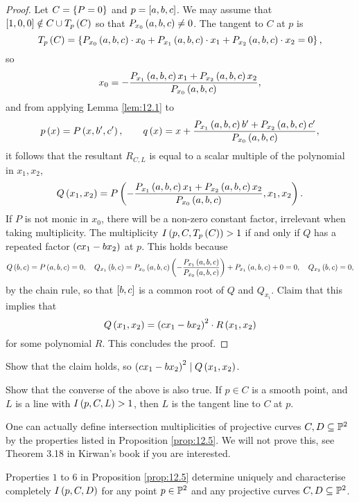\begin{proof}
Let $ C = \cb{P = 0} $ and $ p = \sb{a, b, c} $. We may assume that $ \sb{1, 0, 0} \notin C \cup T_p\rb{C} $ so that $ P_{x_0}\rb{a, b, c} \ne 0 $. The tangent to $ C $ at $ p $ is
$$ T_p\rb{C} = \cb{P_{x_0}\rb{a, b, c} \cdot x_0 + P_{x_1}\rb{a, b, c} \cdot x_1 + P_{x_2}\rb{a, b, c} \cdot x_2 = 0}, $$
so
$$ x_0 = -\dfrac{P_{x_1}\rb{a, b, c}x_1 + P_{x_2}\rb{a, b, c}x_2}{P_{x_0}\rb{a, b, c}}, $$
and from applying Lemma \ref{lem:12.1} to
$$ p\rb{x} = P\rb{x, b', c'}, \qquad q\rb{x} = x + \dfrac{P_{x_1}\rb{a, b, c}b' + P_{x_2}\rb{a, b, c}c'}{P_{x_0}\rb{a, b, c}}, $$
it follows that the resultant $ R_{C, L} $ is equal to a scalar multiple of the polynomial in $ x_1, x_2 $,
$$ Q\rb{x_1, x_2} = P\rb{-\dfrac{P_{x_1}\rb{a, b, c}x_1 + P_{x_2}\rb{a, b, c}x_2}{P_{x_0}\rb{a, b, c}}, x_1, x_2}. $$
If $ P $ is not monic in $ x_0 $, there will be a non-zero constant factor, irrelevant when taking multiplicity. The multiplicity $ I\rb{p, C, T_p\rb{C}} > 1 $ if and only if $ Q $ has a repeated factor $ \rb{cx_1 - bx_2} $ at $ p $. This holds because
$$ Q\rb{b, c} = P\rb{a, b, c} = 0, \quad Q_{x_1}\rb{b, c} = P_{x_0}\rb{a, b, c}\rb{-\dfrac{P_{x_1}\rb{a, b, c}}{P_{x_0}\rb{a, b, c}}} + P_{x_1}\rb{a, b, c} + 0 = 0, \quad Q_{x_2}\rb{b, c} = 0, $$
by the chain rule, so that $ \sb{b, c} $ is a common root of $ Q $ and $ Q_{x_i} $. Claim that this implies that
$$ Q\rb{x_1, x_2} = \rb{cx_1 - bx_2}^2 \cdot R\rb{x_1, x_2} $$
for some polynomial $ R $. This concludes the proof.
\end{proof}

\begin{exercise}
Show that the claim holds, so $ \rb{cx_1 - bx_2}^2 \mid Q\rb{x_1, x_2} $.
\end{exercise}

\begin{exercise}
Show that the converse of the above is also true. If $ p \in C $ is a smooth point, and $ L $ is a line with $ I\rb{p, C, L} > 1 $, then $ L $ is the tangent line to $ C $ at $ p $.
\end{exercise}

\pagebreak

One can actually define intersection multiplicities of projective curves $ C, D \subseteq \P^2 $ by the properties listed in Proposition \ref{prop:12.5}. We will not prove this, see Theorem 3.18 in Kirwan's book if you are interested.

\begin{proposition}
\label{prop:12.8}
Properties $ 1 $ to $ 6 $ in Proposition \ref{prop:12.5} determine uniquely and characterise completely $ I\rb{p, C, D} $ for any point $ p \in \P^2 $ and any projective curves $ C, D \subseteq \P^2 $.
\end{proposition}

